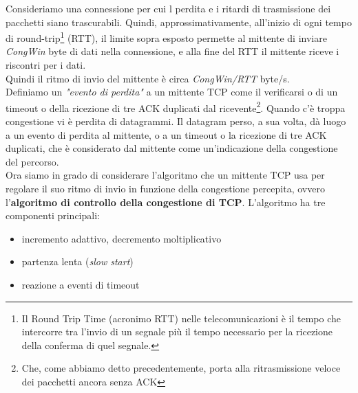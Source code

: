 \documentclass[11pt,a4paper]{article}
\begin{document}
Consideriamo una connessione per cui l perdita e i ritardi di trasmissione dei pacchetti siano trascurabili. Quindi, approssimativamente, all'inizio di ogni tempo di round-trip\footnote{Il Round Trip Time (acronimo RTT) nelle telecomunicazioni è il tempo che intercorre tra l'invio di un segnale più il tempo necessario per la ricezione della conferma di quel segnale.} (RTT), il limite sopra esposto permette al mittente di inviare \emph{CongWin} byte di dati nella connessione, e alla fine del RTT il mittente riceve i riscontri per i dati. \\
Quindi il ritmo di invio del mittente è circa \emph{CongWin/RTT} byte/s. \\
Definiamo un \textit{"evento di perdita"} a un mittente TCP come il verificarsi o di un timeout o della ricezione di tre ACK duplicati dal ricevente\footnote{Che, come abbiamo detto precedentemente, porta alla ritrasmissione veloce dei pacchetti ancora senza ACK}. Quando c'è troppa congestione vi è perdita di datagrammi. Il datagram perso, a sua volta, dà luogo a un evento di perdita al mittente, o a un timeout o la ricezione di tre ACK duplicati, che è considerato dal mittente come un'indicazione della congestione del percorso. \\
Ora siamo in grado di considerare l'algoritmo che un mittente TCP usa per regolare il suo ritmo di invio in funzione della congestione percepita, ovvero l'\textbf{algoritmo di controllo della congestione di TCP}. L'algoritmo ha tre componenti principali:
\begin{itemize}
	\item incremento adattivo, decremento moltiplicativo
	\item partenza lenta (\textit{slow start})
	\item reazione a eventi di timeout
\end{itemize}
\end{document}

